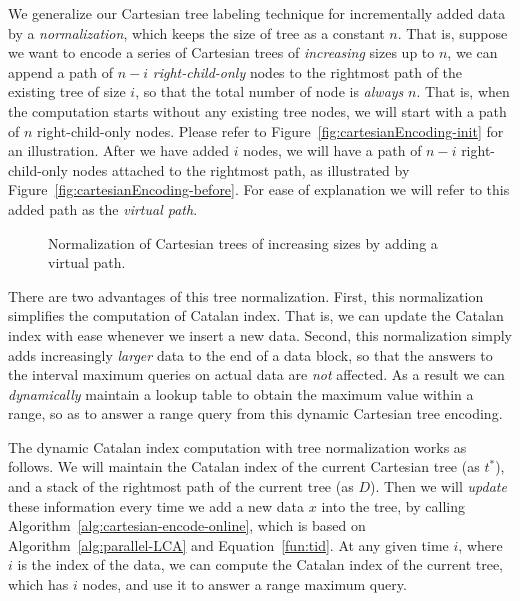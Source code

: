 We generalize our Cartesian tree labeling technique for incrementally
added data by a {\em normalization}, which keeps the size of tree as a
constant $n$.  That is, suppose we want to encode a series of Cartesian
trees of {\em increasing} sizes up to $n$, we can append a path of $n-i$
{\em right-child-only} nodes to the rightmost path of the existing tree
of size $i$, so that the total number of node is {\em always} $n$.  That
is, when the computation starts without any existing tree nodes, we will
start with a path of $n$ right-child-only nodes. Please refer to
Figure~\ref{fig:cartesianEncoding-init} for an illustration.  After we
have added $i$ nodes, we will have a path of $n
- i$ right-child-only nodes attached to the rightmost path, as
illustrated by Figure~\ref{fig:cartesianEncoding-before}.  For ease of
explanation we will refer to this added path as the {\em virtual path}.

\begin{figure*}[!thb]
  \centering {}  
  \caption{Normalization of Cartesian trees of increasing sizes by
    adding a virtual path.}
  \label{fig:cartesianEncoding}
\end{figure*}

There are two advantages of this tree normalization.  First, this
normalization simplifies the computation of Catalan index.  That is,
we can update the Catalan index with ease whenever we insert a new
data. Second, this normalization simply adds increasingly {\em
  larger} data to the end of a data block, so that the answers to the
interval maximum queries on actual data are {\em not} affected.  As a
result we can {\em dynamically} maintain a lookup table to obtain the
maximum value within a range, so as to answer a range query from this
dynamic Cartesian tree encoding.


 
The dynamic Catalan index computation with tree normalization works as
follows.  We will maintain the Catalan index of the current Cartesian
tree (as $t^*$), and a stack of the rightmost path of the current tree
(as $D$).  Then we will {\em update} these information every time we add
a new data $x$ into the tree, by calling
Algorithm~\ref{alg:cartesian-encode-online}, which is based on
Algorithm~\ref{alg:parallel-LCA} and Equation~\ref{fun:tid}.  At any
given time $i$, where $i$ is the index of the data, we can compute the
Catalan index of the current tree, which has $i$ nodes, and use it to
answer a range maximum query.

